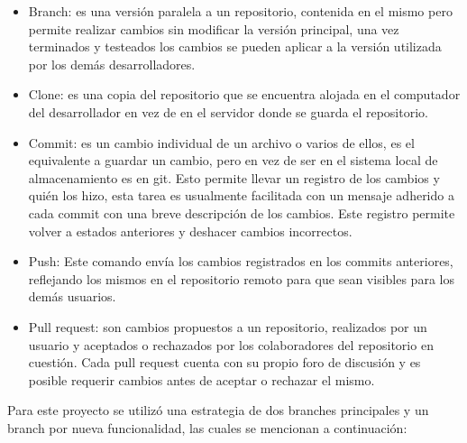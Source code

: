 \begin{itemize}

\item Branch: es una versión paralela a un repositorio, contenida en el mismo pero permite realizar cambios sin modificar la versión principal, una vez terminados y testeados los cambios se pueden aplicar a la versión utilizada por los demás desarrolladores.

\item Clone: es una copia del repositorio que se encuentra alojada en el computador del desarrollador en vez de en el servidor donde se guarda el repositorio.

\item Commit: es un cambio individual de un archivo o varios de ellos, es el equivalente a guardar un cambio, pero en vez de ser en el sistema local de almacenamiento es en git. Esto permite llevar un registro de los cambios y quién los hizo, esta tarea es usualmente facilitada con un mensaje adherido a cada commit con una breve descripción de los cambios. Este registro permite volver a estados anteriores y deshacer cambios incorrectos.

\item Push: Este comando envía los cambios registrados en los commits anteriores, reflejando los mismos en el repositorio remoto para que sean visibles para los demás usuarios.

\item Pull request: son cambios propuestos a un repositorio, realizados por un usuario y aceptados o rechazados por los colaboradores del repositorio en cuestión. Cada pull request cuenta con su propio foro de discusión y es posible requerir cambios antes de aceptar o rechazar el mismo.

\end{itemize}

Para este proyecto se utilizó una estrategia de dos branches principales y un branch por nueva funcionalidad, las cuales se mencionan a continuación:

